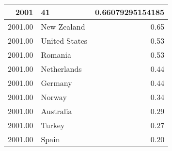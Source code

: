 \begin{table}[ht]
\centering
\begin{tabular}{rlr}
  \hline
2001 & 41 & 0.66079295154185 \\ 
  \hline
2001.00 & New Zealand & 0.65 \\ 
  2001.00 & United States & 0.53 \\ 
  2001.00 & Romania & 0.53 \\ 
  2001.00 & Netherlands & 0.44 \\ 
  2001.00 & Germany & 0.44 \\ 
  2001.00 & Norway & 0.34 \\ 
  2001.00 & Australia & 0.29 \\ 
  2001.00 & Turkey & 0.27 \\ 
  2001.00 & Spain & 0.20 \\ 
   \hline
\end{tabular}
\end{table}

